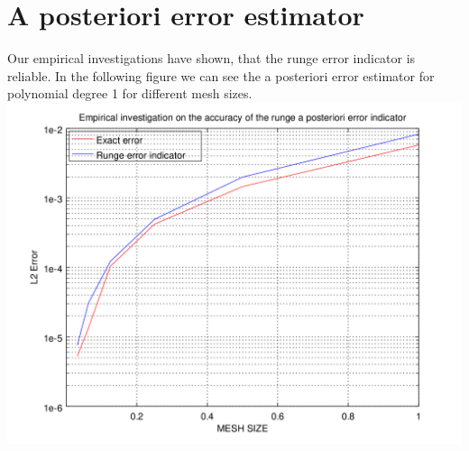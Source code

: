 \documentclass[a4paper,12pt]{report}
\begin{document}
\section{A posteriori error estimator}
Our empirical investigations have shown, that the runge error indicator is reliable. In the following figure we can see the a posteriori error estimator for polynomial degree 1 for different mesh sizes. \\
\includegraphics[scale=0.7]{./error_runge}
\end{document}
